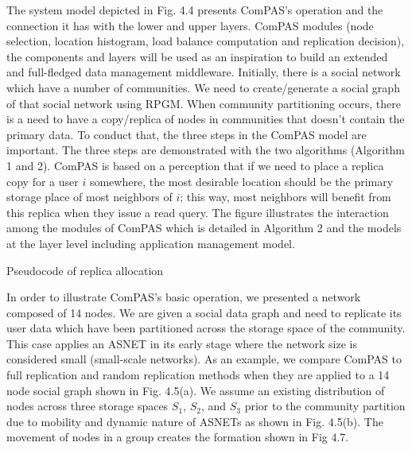 The system model depicted in Fig. 4.4 presents ComPAS's operation and the connection it has with the lower and upper layers.  ComPAS modules (node selection, location histogram, load balance computation and replication decision), the components and layers will be used as an inspiration to build an extended and full-fledged data management middleware. Initially, there is a social network which have a number of communities. We need to create/generate a social graph of that social network using RPGM. When community partitioning occurs, there is a need to have a copy/replica of nodes in communities that doesn't contain the primary data. To conduct that, the three steps in the ComPAS model are important. The three steps are demonstrated with the two algorithms (Algorithm 1 and 2). ComPAS is based on a perception that if we need to place a replica copy for a user $i$ somewhere, the most desirable location should be the primary storage place of most neighbors of $i$; this way, most neighbors will benefit from this replica when they issue a read query. The figure illustrates the interaction among the modules of ComPAS which is detailed in Algorithm 2 and the models at the layer level including application management model.

\begin{algorithm}
\caption{Pseudocode of replica allocation}
\label{alg:chap4_alg02}
\end{algorithm}

In order to illustrate ComPAS's basic operation, we presented a network composed of 14 nodes. We are given a social data graph and need to replicate its user data which have been partitioned across the storage space of the community. This case applies an ASNET in its early stage where the network size is considered small (small-scale networks). As an example, we compare ComPAS to full replication and random replication methods when they are applied to a 14 node social graph shown in Fig. 4.5(a). We assume an existing distribution of nodes across three storage spaces $S_1$, $S_2$, and $S_3$ prior to the community partition due to mobility and dynamic nature of ASNETs as shown in Fig. 4.5(b). The movement of nodes in a group creates the formation shown in Fig 4.7.

